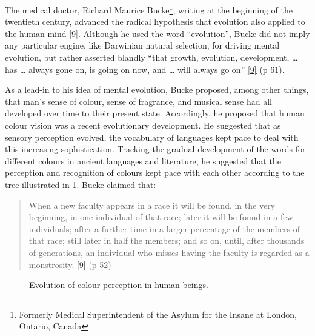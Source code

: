 \documentclass[
  a4paper,
]{article}
\begin{document}
The medical doctor, Richard Maurice Bucke\footnote{Formerly Medical
  Superintendent of the Asylum for the Insane at London, Ontario, Canada},
writing at the beginning of the twentieth century, advanced the radical
hypothesis that evolution also applied to the human mind
\protect\hyperlink{ref-bucke48}{{[}9{]}}. Although he used the word
``evolution'', Bucke did not imply any particular engine, like Darwinian
natural selection, for driving mental evolution, but rather asserted
blandly ``that growth, evolution, development, \ldots{} has \ldots{}
always gone on, is going on now, and \ldots{} will always go on''
\protect\hyperlink{ref-bucke48}{{[}9{]}} (p 61).

As a lead-in to his idea of mental evolution, Bucke proposed, among
other things, that man's sense of colour, sense of fragrance, and
musical sense had all developed over time to their present state.
Accordingly, he proposed that human colour vision was a recent
evolutionary development. He suggested that as sensory perception
evolved, the vocabulary of languages kept pace to deal with this
increasing sophistication. Tracking the gradual development of the words
for different colours in ancient languages and literature, he suggested
that the perception and recognition of colours kept pace with each other
according to the tree illustrated in \cref{fig:colour-tree}. Bucke
claimed that:

\begin{quote}
When a new faculty appears in a race it will be found, in the very
beginning, in one individual of that race; later it will be found in a
few individuals; after a further time in a larger percentage of the
members of that race; still later in half the members; and so on, until,
after thousands of generations, an individual who misses having the
faculty is regarded as a monstrosity.
\protect\hyperlink{ref-bucke48}{{[}9{]}} (p 52)
\end{quote}

\begin{figure}
\hypertarget{fig:colour-tree}{%
\centering

\caption[Evolution of colour perception in human beings.]{Evolution of
colour perception in human
beings.\footnotemark{}}\label{fig:colour-tree}
}
\end{figure}
\end{document}
